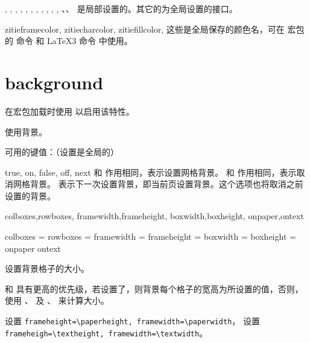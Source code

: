 \documentclass{ctxdoc}
\begin{document}
\begin{function}{
  \zitiebasechar,
  \zitiebasecharwidth,
  \zitiebasecharheight,
  \zitiewidth,
  \zitieheight,
  \zitieboxwd,
  \zitieboxht,
  \zitieboxdp,
  \zitiefontname,
  \zitiexscaleratio,
  \zitieyscaleratio,
}
  、、 是局部设置的。其它的为全局设置的接口。
\end{function}

\begin{function}{
  zitieframecolor,
  zitiecharcolor,
  zitiefillcolor,
}
  这些是全局保存的颜色名，可在  宏包的  命令 和 \LaTeX3 命令  中使用。
\end{function}


\section{background}\label{sec:background}

在宏包加载时使用  以启用该特性。

\begin{function}{\zitiebackground}
  \begin{syntax}
     
  \end{syntax}
  使用背景。
\end{function}

 可用的键值：（设置是全局的）

\begin{function}{true, on, false, off, next}
   和  作用相同，表示设置网格背景。
   和  作用相同，表示取消网格背景。
   表示下一次设置背景，即当前页设置背景。这个选项也将取消之前设置的背景。
\end{function}

\begin{function}{
  colboxes,rowboxes,
  framewidth,frameheight,
  boxwidth,boxheight,
  onpaper,ontext
}
  \begin{syntax}
    colboxes    =  
    rowboxes    =  
    framewidth  = 
    frameheight = 
    boxwidth    = 
    boxheight   = 
    onpaper
    ontext
  \end{syntax}
  设置背景格子的大小。

   和  具有更高的优先级，若设置了，则背景每个格子的宽高为所设置的值，否则，使用 、 及 、 来计算大小。

   设置 \verb|frameheight=\paperheight, framewidth=\paperwidth|，
   设置 \verb|frameheigh=\textheight, framewidth=\textwidth|。
\end{function}
\end{document}
